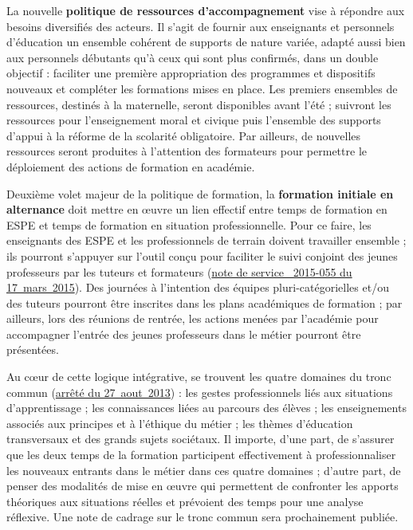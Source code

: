 La nouvelle \textbf{politique de ressources d’accompagnement} vise à répondre aux besoins diversifiés des acteurs. Il s’agit de fournir aux enseignants et personnels d’éducation un ensemble cohérent de supports de nature variée, adapté aussi bien aux personnels débutants qu’à ceux qui sont plus confirmés, dans un double objectif : faciliter une première appropriation des programmes et dispositifs nouveaux et compléter les formations mises en place. Les premiers ensembles de ressources, destinés à la maternelle, seront disponibles avant l’été ; suivront les ressources pour l’enseignement moral et civique puis l’ensemble des supports d’appui à la réforme de la scolarité obligatoire. Par ailleurs, de nouvelles ressources seront produites à l’attention des formateurs pour permettre le déploiement des actions de formation en académie.

Deuxième volet majeur de la politique de formation, la \textbf{formation initiale en alternance} doit mettre en œuvre un lien effectif entre temps de formation en ESPE et temps de formation en situation professionnelle. Pour ce faire, les enseignants des ESPE et les professionnels de terrain doivent travailler ensemble ; ils pourront s’appuyer sur l’outil conçu pour faciliter le suivi conjoint des jeunes professeurs par les tuteurs et formateurs (\href{http://www.education.gouv.fr/pid25535/bulletin_officiel.html?cid_bo=87000}{note de service \no{}~2015-055 du 17~mars~2015}). Des journées à l’intention des équipes pluri-catégorielles et/ou des tuteurs pourront être inscrites dans les plans académiques de formation ; par ailleurs, lors des réunions de rentrée, les actions menées par l’académie pour accompagner l’entrée des jeunes professeurs dans le métier pourront être présentées.

Au cœur de cette logique intégrative, se trouvent les quatre domaines du tronc commun (\href{http://www.legifrance.gouv.fr/affichTexte.do?cidTexte=JORFTEXT000027905257&categorieLien=id}{arrêté du 27~aout~2013}) : les gestes professionnels liés aux situations d’apprentissage ; les connaissances liées au parcours des élèves ; les enseignements associés aux principes et à l’éthique du métier ; les thèmes d’éducation transversaux et des grands sujets sociétaux. Il importe, d’une part, de s’assurer que les deux temps de la formation participent effectivement à professionnaliser les nouveaux entrants dans le métier dans ces quatre domaines ; d’autre part, de penser des modalités de mise en œuvre qui permettent de confronter les apports théoriques aux situations réelles et prévoient des temps pour une analyse réflexive. Une note de cadrage sur le tronc commun sera prochainement publiée.

